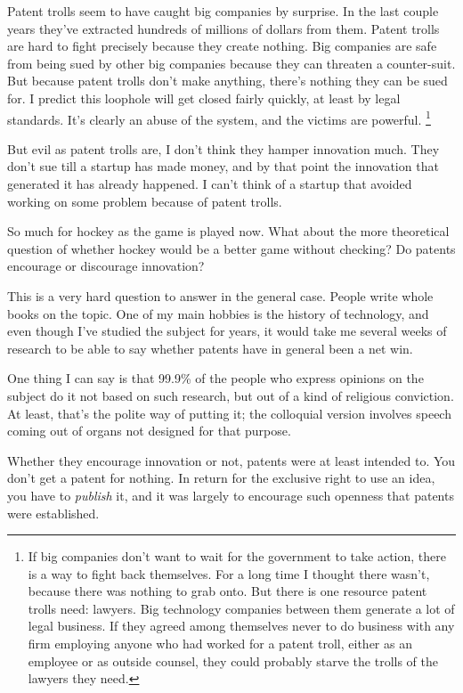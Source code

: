 Patent trolls seem to have caught big companies by surprise. In the last
couple years they've extracted hundreds of millions of dollars from
them. Patent trolls are hard to fight precisely because they create
nothing. Big companies are safe from being sued by other big companies
because they can threaten a counter-suit. But because patent trolls
don't make anything, there's nothing they can be sued for. I predict
this loophole will get closed fairly quickly, at least by legal
standards. It's clearly an abuse of the system, and the victims are
powerful. \footnote{If big companies don't want to wait for the government to take
action, there is a way to fight back themselves. For a long time I
thought there wasn't, because there was nothing to grab onto. But there
is one resource patent trolls need: lawyers. Big technology companies
between them generate a lot of legal business. If they agreed among
themselves never to do business with any firm employing anyone who had
worked for a patent troll, either as an employee or as outside counsel,
they could probably starve the trolls of the lawyers they need.}

But evil as patent trolls are, I don't think they hamper innovation
much. They don't sue till a startup has made money, and by that point
the innovation that generated it has already happened. I can't think of
a startup that avoided working on some problem because of patent trolls.

So much for hockey as the game is played now. What about the more
theoretical question of whether hockey would be a better game without
checking? Do patents encourage or discourage innovation?

This is a very hard question to answer in the general case. People write
whole books on the topic. One of my main hobbies is the history of
technology, and even though I've studied the subject for years, it would
take me several weeks of research to be able to say whether patents have
in general been a net win.

One thing I can say is that 99.9\% of the people who express opinions on
the subject do it not based on such research, but out of a kind of
religious conviction. At least, that's the polite way of putting it; the
colloquial version involves speech coming out of organs not designed for
that purpose.

Whether they encourage innovation or not, patents were at least intended
to. You don't get a patent for nothing. In return for the exclusive
right to use an idea, you have to \emph{publish} it, and it was largely
to encourage such openness that patents were established.

